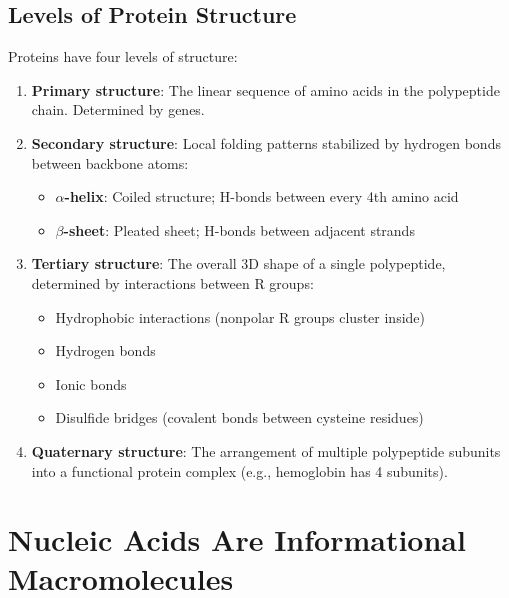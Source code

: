 \documentclass{report}
\begin{document}
\subsection{Levels of Protein Structure}

Proteins have four levels of structure:

\begin{enumerate}
    \item \textbf{Primary structure}: The linear sequence of amino acids in the polypeptide chain. Determined by genes.
    
    \item \textbf{Secondary structure}: Local folding patterns stabilized by hydrogen bonds between backbone atoms:
    \begin{itemize}
        \item \textbf{\(\alpha\)-helix}: Coiled structure; H-bonds between every 4th amino acid
        \item \textbf{\(\beta\)-sheet}: Pleated sheet; H-bonds between adjacent strands
    \end{itemize}
    
    \item \textbf{Tertiary structure}: The overall 3D shape of a single polypeptide, determined by interactions between R groups:
    \begin{itemize}
        \item Hydrophobic interactions (nonpolar R groups cluster inside)
        \item Hydrogen bonds
        \item Ionic bonds
        \item Disulfide bridges (covalent bonds between cysteine residues)
    \end{itemize}
    
    \item \textbf{Quaternary structure}: The arrangement of multiple polypeptide subunits into a functional protein complex (e.g., hemoglobin has 4 subunits).
\end{enumerate}


\section{Nucleic Acids Are Informational Macromolecules}
\end{document}
